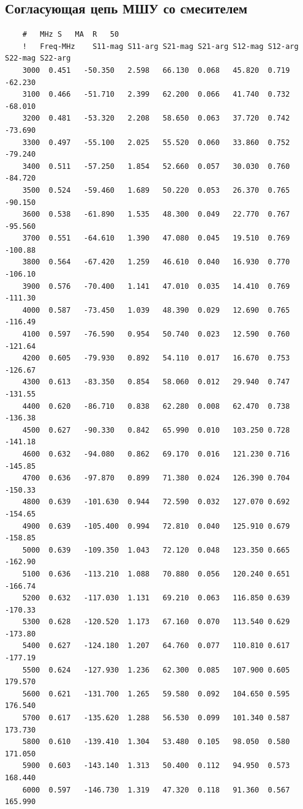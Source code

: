 \documentclass[utf8x, 14pt, oneside, a4paper]{article}
\begin{document}
	
	\subsection*{Согласующая цепь МШУ со смесителем}
	\begin{lstlisting}
	#	MHz	S	MA	R	50										
	!	Freq-MHz	S11-mag	S11-arg	S21-mag	S21-arg	S12-mag	S12-arg	S22-mag	S22-arg	
	3000  0.451   -50.350	2.598	66.130	0.068	45.820	0.719	-62.230
	3100  0.466   -51.710	2.399	62.200	0.066	41.740	0.732	-68.010
	3200  0.481   -53.320	2.208	58.650	0.063	37.720	0.742	-73.690
	3300  0.497   -55.100	2.025	55.520	0.060	33.860	0.752	-79.240
	3400  0.511   -57.250	1.854	52.660	0.057	30.030	0.760	-84.720
	3500  0.524   -59.460	1.689	50.220	0.053	26.370	0.765	-90.150
	3600  0.538   -61.890	1.535	48.300	0.049	22.770	0.767	-95.560
	3700  0.551   -64.610	1.390	47.080	0.045	19.510	0.769	-100.88
	3800  0.564   -67.420	1.259	46.610	0.040	16.930	0.770	-106.10
	3900  0.576   -70.400	1.141	47.010	0.035	14.410	0.769	-111.30
	4000  0.587   -73.450	1.039	48.390	0.029	12.690	0.765	-116.49
	4100  0.597   -76.590	0.954	50.740	0.023	12.590	0.760	-121.64
	4200  0.605   -79.930	0.892	54.110	0.017	16.670	0.753	-126.67
	4300  0.613   -83.350	0.854	58.060	0.012	29.940	0.747	-131.55
	4400  0.620   -86.710	0.838	62.280	0.008	62.470	0.738	-136.38
	4500  0.627   -90.330	0.842	65.990	0.010	103.250	0.728	-141.18
	4600  0.632   -94.080	0.862	69.170	0.016	121.230	0.716	-145.85
	4700  0.636   -97.870	0.899	71.380	0.024	126.390	0.704	-150.33
	4800  0.639   -101.630	0.944	72.590	0.032	127.070	0.692	-154.65
	4900  0.639   -105.400	0.994	72.810	0.040	125.910	0.679	-158.85
	5000  0.639   -109.350	1.043	72.120	0.048	123.350	0.665	-162.90
	5100  0.636   -113.210	1.088	70.880	0.056	120.240	0.651	-166.74
	5200  0.632   -117.030	1.131	69.210	0.063	116.850	0.639	-170.33
	5300  0.628   -120.520	1.173	67.160	0.070	113.540	0.629	-173.80
	5400  0.627   -124.180	1.207	64.760	0.077	110.810	0.617	-177.19
	5500  0.624   -127.930	1.236	62.300	0.085	107.900	0.605	179.570
	5600  0.621   -131.700	1.265	59.580	0.092	104.650	0.595	176.540
	5700  0.617   -135.620	1.288	56.530	0.099	101.340	0.587	173.730
	5800  0.610   -139.410	1.304	53.480	0.105	98.050	0.580	171.050
	5900  0.603   -143.140	1.313	50.400	0.112	94.950	0.573	168.440
	6000  0.597   -146.730	1.319	47.320	0.118	91.360	0.567	165.990
	\end{lstlisting}
	\pagebreak
	
	
\end{document}
